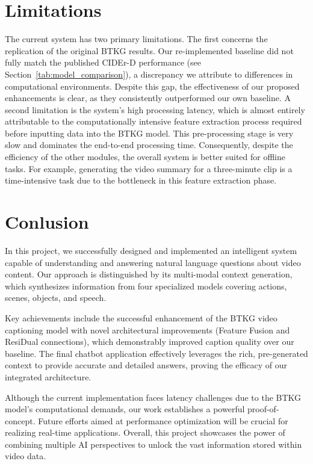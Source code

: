 \section{Limitations}

The current system has two primary limitations. The first concerns the replication of the original BTKG results. Our re-implemented baseline did not fully match the published CIDEr-D performance (see Section~\ref{tab:model_comparison}), a discrepancy we attribute to differences in computational environments. Despite this gap, the effectiveness of our proposed enhancements is clear, as they consistently outperformed our own baseline. A second limitation is the system's high processing latency, which is almost entirely attributable to the computationally intensive feature extraction process required before inputting data into the BTKG model. This pre-processing stage is very slow and dominates the end-to-end processing time. Consequently, despite the efficiency of the other modules, the overall system is better suited for offline tasks. For example, generating the video summary for a three-minute clip is a time-intensive task due to the bottleneck in this feature extraction phase.



\section{Conlusion}

In this project, we successfully designed and implemented an intelligent system capable of understanding and answering natural language questions about video content. Our approach is distinguished by its multi-modal context generation, which synthesizes information from four specialized models covering actions, scenes, objects, and speech.

Key achievements include the successful enhancement of the BTKG video captioning model with novel architectural improvements (Feature Fusion and ResiDual connections), which demonstrably improved caption quality over our baseline. The final chatbot application effectively leverages the rich, pre-generated context to provide accurate and detailed answers, proving the efficacy of our integrated architecture.

Although the current implementation faces latency challenges due to the BTKG model's computational demands, our work establishes a powerful proof-of-concept. Future efforts aimed at performance optimization will be crucial for realizing real-time applications. Overall, this project showcases the power of combining multiple AI perspectives to unlock the vast information stored within video data.

